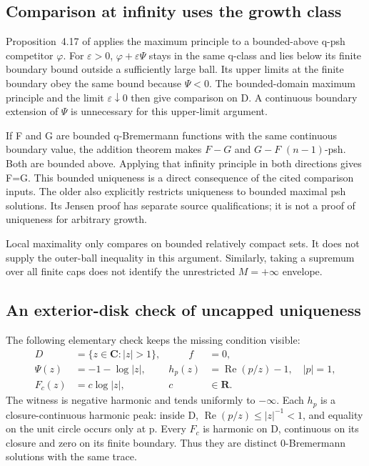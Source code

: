 \subsection{Comparison at infinity uses the growth class}
\label{sec:appH-unbounded-infinity-comparison}

Proposition~4.17 of \cite[actual pp.~9--10]{Pawlaschyk26UnboundedPerronV1}
applies the maximum principle to a bounded-above q-psh competitor \(\varphi\).
For \(\varepsilon>0\), \(\varphi+\varepsilon\Psi\) stays in the same q-class
and lies below its finite boundary bound outside a sufficiently large ball.
Its upper limits at the finite boundary obey the same bound because
\(\Psi<0\). The bounded-domain maximum principle and the limit
\(\varepsilon\downarrow0\) then give comparison on D. A continuous
boundary extension of \(\Psi\) is unnecessary for this upper-limit argument.

If F and G are bounded q-Bremermann functions with the same continuous
boundary value, the addition theorem makes \(F-G\) and \(G-F\)
\((n-1)\)-psh. Both are bounded above. Applying that infinity principle
in both directions gives F=G. This bounded uniqueness is a direct
consequence of the cited comparison inputs. The older
\cite[Theorem~4.4; printed pp.~1398--1400]{NguyenHung08UnboundedPublished}
also explicitly restricts uniqueness to bounded maximal psh solutions.
Its Jensen proof has separate source qualifications; it is not a proof
of uniqueness for arbitrary growth.

Local maximality only compares on bounded relatively compact sets.
It does not supply the outer-ball inequality in this argument. Similarly,
taking a supremum over all finite caps does not identify the unrestricted
\(M=+\infty\) envelope.

\subsection{An exterior-disk check of uncapped uniqueness}
\label{sec:appH-unbounded-growth-counterexample}

The following elementary check keeps the missing condition visible:
\[
\begin{aligned}
 D&=\{z\in\mathbf C:|z|>1\},&\qquad f&=0,\\
 \Psi(z)&=-1-\log|z|,& h_p(z)&=\operatorname{Re}(p/z)-1,
                  \quad |p|=1,\\
 F_c(z)&=c\log|z|,& c&\in\mathbf R.
\end{aligned}
\tag{H.24}\label{eq:appH-unbounded-exterior-family}
\]
The witness is negative harmonic and tends uniformly to \(-\infty\).
Each \(h_p\) is a closure-continuous harmonic peak: inside D,
\(\operatorname{Re}(p/z)\leq|z|^{-1}<1\), and equality on the unit
circle occurs only at p. Every \(F_c\) is harmonic on D, continuous
on its closure and zero on its finite boundary. Thus they are distinct
0-Bremermann solutions with the same trace.

